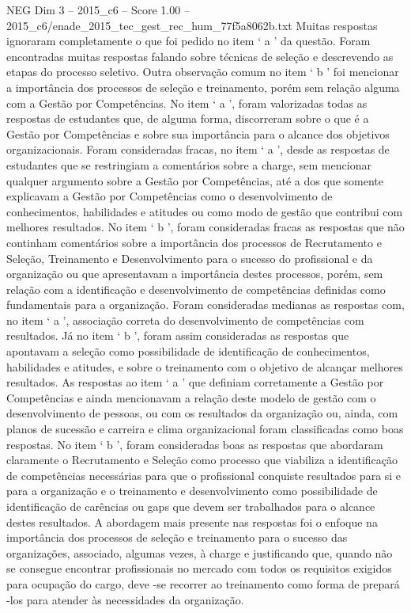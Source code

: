 \begin{textsample}{NEG Dim 3 – 2015\_c6 – Score 1.00 – 2015\_c6/enade\_2015\_tec\_gest\_rec\_hum\_77f5a8062b.txt}
Muitas respostas ignoraram completamente o que foi pedido no item ‘ a ’ da questão.
Foram encontradas muitas respostas falando sobre técnicas de seleção e descrevendo as etapas do processo seletivo.
Outra observação comum no item ‘ b ’ foi mencionar a importância dos processos de seleção e treinamento, porém sem relação alguma com a Gestão por Competências.
No item ‘ a ’, foram valorizadas todas as respostas de estudantes que, de alguma forma, discorreram sobre o que é a Gestão por Competências e sobre sua importância para o alcance dos objetivos organizacionais.
Foram consideradas fracas, no item ‘ a ’, desde as respostas de estudantes que se restringiam a comentários sobre a charge, sem mencionar qualquer argumento sobre a Gestão por Competências, até a dos que somente explicavam a Gestão por Competências como o desenvolvimento de conhecimentos, habilidades e atitudes ou como modo de gestão que contribui com melhores resultados.
No item ‘ b ’, foram consideradas fracas as respostas que não continham comentários sobre a importância dos processos de Recrutamento e Seleção, Treinamento e Desenvolvimento para o sucesso do profissional e da organização ou que apresentavam a importância destes processos, porém, sem relação com a identificação e desenvolvimento de competências definidas como fundamentais para a organização.
Foram consideradas medianas as respostas com, no item ‘ a ’, associação correta do desenvolvimento de competências com resultados.
Já no item ‘ b ’, foram assim consideradas as respostas que apontavam a seleção como possibilidade de identificação de conhecimentos, habilidades e atitudes, e sobre o treinamento com o objetivo de alcançar melhores resultados.
As respostas ao item ‘ a ’ que definiam corretamente a Gestão por Competências e ainda mencionavam a relação deste modelo de gestão com o desenvolvimento de pessoas, ou com os resultados da organização ou, ainda, com planos de sucessão e carreira e clima organizacional foram classificadas como boas respostas.
No item ‘ b ’, foram consideradas boas as respostas que abordaram claramente o Recrutamento e Seleção como processo que viabiliza a identificação de competências necessárias para que o profissional conquiste resultados para si e para a organização e o treinamento e desenvolvimento como possibilidade de identificação de carências ou gaps que devem ser trabalhados para o alcance destes resultados.
A abordagem mais presente nas respostas foi o enfoque na importância dos processos de seleção e treinamento para o sucesso das organizações, associado, algumas vezes, à charge e justificando que, quando não se consegue encontrar profissionais no mercado com todos os requisitos exigidos para ocupação do cargo, deve -se recorrer ao treinamento como forma de prepará -los para atender às necessidades da organização.

\end{textsample}
